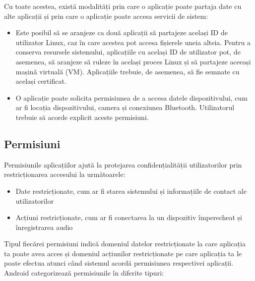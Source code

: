 \documentclass[12pt,a4paper]{report}
\begin{document}
Cu toate acestea, există modalități prin care o aplicație poate partaja date cu alte aplicații și prin care o aplicație poate accesa servicii de sistem\cite{android-application-fundamentals}:
\begin{itemize}
    \item Este posibil să se aranjeze ca două aplicații să partajeze același ID de utilizator Linux, caz în care acestea pot accesa fișierele uneia alteia. Pentru a conserva resursele sistemului, aplicațiile cu același ID de utilizator pot, de asemenea, să aranjeze să ruleze în același proces Linux și să partajeze aceeași mașină virtuală (VM). Aplicațiile trebuie, de asemenea, să fie semnate cu același certificat.
    \item O aplicație poate solicita permisiunea de a accesa datele dispozitivului, cum ar fi locația dispozitivului, camera și conexiunea Bluetooth. Utilizatorul trebuie să acorde explicit aceste permisiuni.
\end{itemize}

\subsection{Permisiuni}
Permisiunile aplicațiilor ajută la protejarea confidențialității utilizatorilor\cite{android-permissions} prin restricționarea accesului la următoarele:
\begin{itemize}
    \item Date restricționate, cum ar fi starea sistemului și informațiile de contact ale utilizatorilor
    \item Acțiuni restricționate, cum ar fi conectarea la un dispozitiv împerecheat și înregistrarea audio
\end{itemize}

Tipul fiecărei permisiuni indică domeniul datelor restricționate la care aplicația ta poate avea acces și domeniul acțiunilor restricționate 
pe care aplicația ta le poate efectua atunci când sistemul acordă permisiunea respectivei aplicații.\cite{android-permissions}
Android categorizează permisiunile în diferite tipuri:
\end{document}
